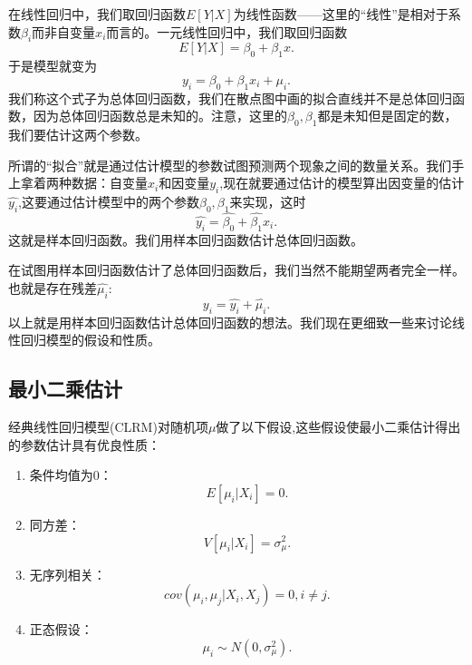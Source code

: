 \documentclass[lang=cn,10pt]{elegantbook}
\begin{document}
    在线性回归中，我们取回归函数\(E[Y|X]\)为线性函数——这里的“线性”是相对于系数\(\beta_i\)而非自变量\(x_i\)而言的。一元线性回归中，我们取回归函数
    \[E[Y|X]=\beta_0+\beta_1x.\]
    于是模型就变为
    \[y_i=\beta_0+\beta_1x_i+\mu_i.\]
    我们称这个式子为总体回归函数，我们在散点图中画的拟合直线并不是总体回归函数，因为总体回归函数总是未知的。注意，这里的\(\beta_0,\beta_1\)都是未知但是固定的数，我们要估计这两个参数。

    所谓的“拟合”就是通过估计模型的参数试图预测两个现象之间的数量关系。我们手上拿着两种数据：自变量\(x_i\)和因变量\(y_i\),现在就要通过估计的模型算出因变量的估计\(\hat{y_i}\),这要通过估计模型中的两个参数\(\beta_0,\beta_1\)来实现，这时
    \[\hat{y_i}=\hat{\beta_0}+\hat{\beta_1}x_i.\]
    这就是样本回归函数。我们用样本回归函数估计总体回归函数。

    在试图用样本回归函数估计了总体回归函数后，我们当然不能期望两者完全一样。也就是存在残差\(\hat{\mu_i}\):
    \[y_i=\hat{y_i}+\hat{\mu_i}.\]
    以上就是用样本回归函数估计总体回归函数的想法。我们现在更细致一些来讨论线性回归模型的假设和性质。
    \subsection{最小二乘估计}

    经典线性回归模型(CLRM)对随机项\(\mu\)做了以下假设,这些假设使最小二乘估计得出的参数估计具有优良性质：
    \begin{enumerate}
        \item 条件均值为0：\[E[\mu_i|X_i]=0.\]
        \item 同方差：\[V[\mu_i|X_i]=\sigma_\mu^2.\]
        \item 无序列相关：\[cov(\mu_i,\mu_j|X_i,X_j)=0,i\ne j.\]
        \item 正态假设：\[\mu_i\sim N(0,\sigma_\mu^2).\]
    \end{enumerate}
\end{document}
